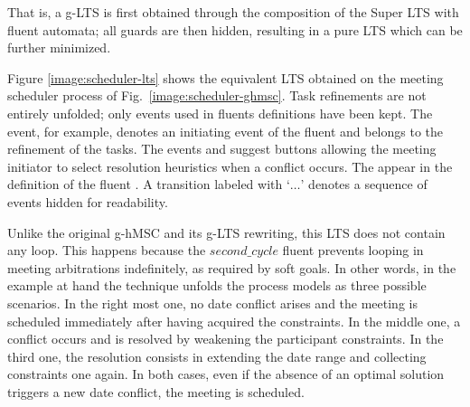 That is, a g-LTS is first obtained through the composition of the Super LTS with fluent automata; all guards are then hidden, resulting in a pure LTS which can be further minimized.

Figure \ref{image:scheduler-lts} shows the equivalent LTS obtained on the meeting scheduler process of Fig.~\ref{image:scheduler-ghmsc}. Task refinements are not entirely unfolded; only events used in fluents definitions have been kept. The  event, for example, denotes an initiating event of the  fluent and belongs to the refinement of the  tasks. The events  and  suggest buttons allowing the meeting initiator to select resolution heuristics when a conflict occurs. The appear in the definition of the fluent . A transition labeled with `$\ldots$' denotes a sequence of events hidden for readability.  

Unlike the original g-hMSC and its g-LTS rewriting, this LTS does not contain any loop. This happens because the $second\_cycle$ fluent prevents looping in meeting arbitrations indefinitely, as required by soft goals. In other words, in the example at hand the technique unfolds the process models as three possible scenarios. In the right most one, no date conflict arises and the meeting is scheduled immediately after having acquired the constraints. In the middle one, a conflict occurs and is resolved by weakening the participant constraints. In the third one, the resolution consists in extending the date range and collecting constraints one again. In both cases, even if the absence of an optimal solution triggers a new date conflict, the meeting is scheduled. 

